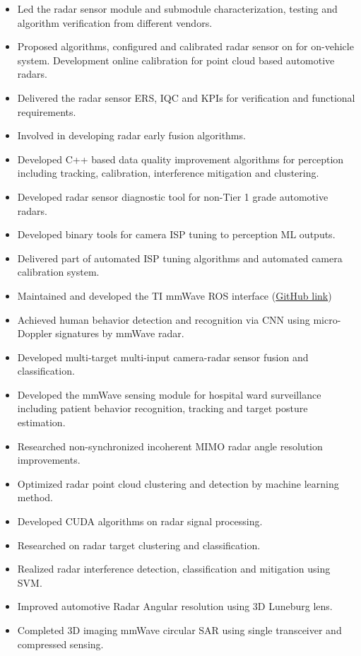 \documentclass[10pt,letter,ragged2e,withhyper]{leozhang}
\begin{document}
\divider

\begin{itemize}
  \item Led the radar sensor module and submodule characterization, testing and algorithm verification from different vendors.
  \item Proposed algorithms, configured and calibrated radar sensor on for on-vehicle system. Development online calibration for point cloud based automotive radars.
  \item Delivered the radar sensor ERS, IQC and KPIs for verification and functional requirements.
  \item Involved in developing radar early fusion algorithms.
  \item Developed C++ based data quality improvement algorithms for perception including tracking, calibration, interference mitigation and clustering.
  \item Developed radar sensor diagnostic tool for non-Tier 1 grade automotive radars.
  \item Developed binary tools for camera ISP tuning to perception ML outputs.
  \item Delivered part of automated ISP tuning algorithms and automated camera calibration system.
\end{itemize}

\divider

\begin{itemize}
  \item Maintained and developed the TI mmWave ROS interface (\href{https://github.com/radar-lab/ti_mmwave_rospkg}{GitHub link})
  \item Achieved human behavior detection and recognition via CNN using micro-Doppler signatures by mmWave radar.
  \item Developed multi-target multi-input camera-radar sensor fusion and classification.
  \item Developed the mmWave sensing module for hospital ward surveillance including patient behavior recognition, tracking and target posture estimation.
  \item Researched non-synchronized incoherent MIMO radar angle resolution improvements.
  \item Optimized radar point cloud clustering and detection by machine learning method.
  \item Developed CUDA algorithms on radar signal processing.
  \item Researched on radar target clustering and classification.
  \item Realized radar interference detection, classification and mitigation using SVM.
  \item Improved automotive Radar Angular resolution using 3D Luneburg lens.
  \item Completed 3D imaging mmWave circular SAR using single transceiver and compressed sensing.
\end{itemize}
\end{document}
